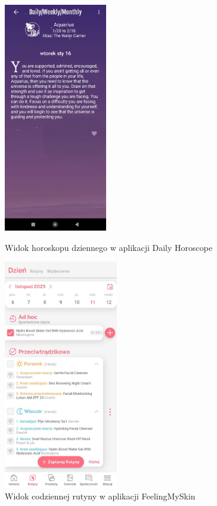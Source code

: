 \begin{figure}[t]
  \begin{minipage}{0.4\textwidth}
    \centering
    \includegraphics[height=10cm, keepaspectratio]{images/analiza/dailyHoroscope}
    \caption{Widok horoskopu dziennego w aplikacji Daily Horoscope}
    \label{fig:dailyHoroscope}
  \end{minipage}
  \hfill
  \begin{minipage}{0.4\textwidth}
    \centering
    \includegraphics[height=10cm, keepaspectratio]{images/analiza/feelingMySkin}
    \caption{Widok codziennej rutyny w aplikacji FeelingMySkin}
    \label{fig:feelingMySkin}
  \end{minipage}
\end{figure}

